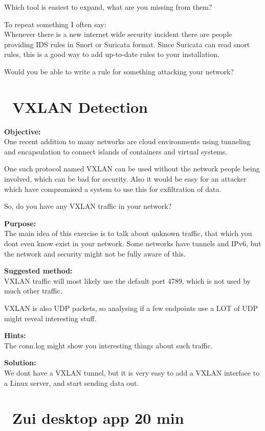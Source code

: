 \documentclass[a4paper,11pt,notitlepage]{report}
\begin{document}
Which tool is easiest to expand, what are you missing from them?

To repeat something I often say:\\
Whenever there is a new internet wide security incident there are people providing IDS rules in Snort or Suricata format. Since Suricata can read snort rules, this is a good way to add up-to-date rules to your installation.

Would you be able to write a rule for something attacking your network?


\chapter{\faInfoCircle\ VXLAN Detection}
\label{ex:vxlandetect}


{\bf Objective:} \\
One recent addition to many networks are cloud environments using tunneling and encapsulation to connect islands of containers and virtual systems.

One such protocol named VXLAN can be used without the network people being involved, which can be bad for security. Also it would be easy for an attacker which have compromised a system to use this for exfiltration of data.

So, do you have any VXLAN traffic in your network?


{\bf Purpose:}\\
The main idea of this exercise is to talk about unknown traffic, that which you dont even know exist in your network. Some networks have tunnels and IPv6, but the network and security might not be fully aware of this.


{\bf Suggested method:}\\
VXLAN traffic will most likely use the default port 4789, which is not used by much other traffic.

VXLAN is also UDP packets, so analysing if a few endpoints use a LOT of UDP might reveal interesting stuff.


{\bf Hints:}\\
The conn.log might show you interesting things about such traffic.


{\bf Solution:}\\
We dont have a VXLAN tunnel, but it is very easy to add a VXLAN interface to a Linux server, and start sending data out.





\chapter{\faInfoCircle\ Zui desktop app 20 min}
\label{ex:brim-security}
\end{document}
